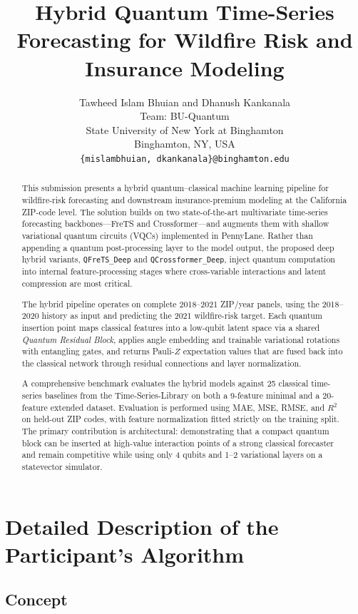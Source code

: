 \documentclass[11pt]{article}
\title{Hybrid Quantum Time-Series Forecasting for Wildfire Risk and Insurance Modeling}
\author{%
  Tawheed Islam Bhuian and Dhanush Kankanala \\
  Team: BU-Quantum \\
  State University of New York at Binghamton \\
  Binghamton, NY, USA \\
  \texttt{\{mislambhuian, dkankanala\}@binghamton.edu} \\
}
\date{}
\begin{document}
\maketitle

\begin{abstract}
This submission presents a hybrid quantum--classical machine learning pipeline for wildfire-risk forecasting and downstream insurance-premium modeling at the California ZIP-code level. The solution builds on two state-of-the-art multivariate time-series forecasting backbones---FreTS and Crossformer---and augments them with shallow variational quantum circuits (VQCs) implemented in PennyLane. Rather than appending a quantum post-processing layer to the model output, the proposed deep hybrid variants, \texttt{QFreTS\_Deep} and \texttt{QCrossformer\_Deep}, inject quantum computation into internal feature-processing stages where cross-variable interactions and latent compression are most critical.

The hybrid pipeline operates on complete 2018--2021 ZIP/year panels, using the 2018--2020 history as input and predicting the 2021 wildfire-risk target. Each quantum insertion point maps classical features into a low-qubit latent space via a shared \emph{Quantum Residual Block}, applies angle embedding and trainable variational rotations with entangling gates, and returns Pauli-$Z$ expectation values that are fused back into the classical network through residual connections and layer normalization.

A comprehensive benchmark evaluates the hybrid models against 25 classical time-series baselines from the Time-Series-Library on both a 9-feature minimal and a 20-feature extended dataset. Evaluation is performed using MAE, MSE, RMSE, and $R^2$ on held-out ZIP codes, with feature normalization fitted strictly on the training split. The primary contribution is architectural: demonstrating that a compact quantum block can be inserted at high-value interaction points of a strong classical forecaster and remain competitive while using only 4 qubits and 1--2 variational layers on a statevector simulator.
\end{abstract}

\newpage

\section{Detailed Description of the Participant's Algorithm}

\subsection{Concept}
\end{document}
